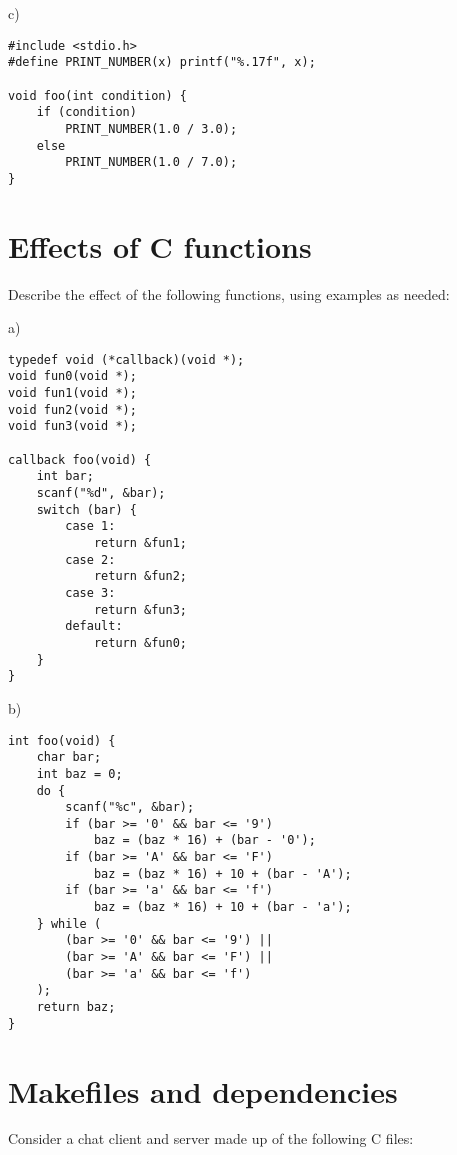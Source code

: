\documentclass[a4paper,12pt]{article}
\begin{document}
c) %

\begin{lstlisting}
#include <stdio.h>
#define PRINT_NUMBER(x) printf("%.17f", x);

void foo(int condition) {
	if (condition)
		PRINT_NUMBER(1.0 / 3.0);
	else
		PRINT_NUMBER(1.0 / 7.0);
}
\end{lstlisting}

\newpage

\section{Effects of C functions}

Describe the effect of the following functions, using examples as
needed:

a)

\begin{lstlisting}
typedef void (*callback)(void *);
void fun0(void *);
void fun1(void *);
void fun2(void *);
void fun3(void *);

callback foo(void) {
	int bar;
	scanf("%d", &bar);
	switch (bar) {
		case 1:
			return &fun1;
		case 2:
			return &fun2;
		case 3:
			return &fun3;
		default:
			return &fun0;
	}
}
\end{lstlisting}

b)

\begin{lstlisting}
int foo(void) {
	char bar;
	int baz = 0;
	do {
		scanf("%c", &bar);
		if (bar >= '0' && bar <= '9')
			baz = (baz * 16) + (bar - '0');
		if (bar >= 'A' && bar <= 'F')
			baz = (baz * 16) + 10 + (bar - 'A');
		if (bar >= 'a' && bar <= 'f')
			baz = (baz * 16) + 10 + (bar - 'a');
	} while (
		(bar >= '0' && bar <= '9') ||
		(bar >= 'A' && bar <= 'F') ||
		(bar >= 'a' && bar <= 'f')
	);
	return baz;
}
\end{lstlisting}

\newpage

\section{Makefiles and dependencies}

Consider a chat client and server made up of the following C files:
\end{document}
